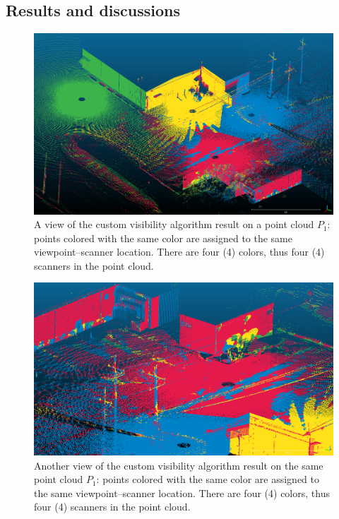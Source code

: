 \subsection{Results and discussions}
\begin{figure}[h]
  \centering
  \includegraphics[scale=0.35]{img/custom-result1.png}
  \caption{A view of the custom visibility algorithm result on a point cloud $P_1$: points colored with the same color are assigned to the same viewpoint--scanner location. There are four (4) colors, thus four (4) scanners in the point cloud.}
  \label{fig:custom-result1}
\end{figure}
\begin{figure}[h]
  \centering
  \includegraphics[scale=0.35]{img/custom-result2.png}
  \caption{Another view of the custom visibility algorithm result on the same point cloud $P_1$: points colored with the same color are assigned to the same viewpoint--scanner location. There are four (4) colors, thus four (4) scanners in the point cloud.}
  \label{fig:custom-result2}
\end{figure}
